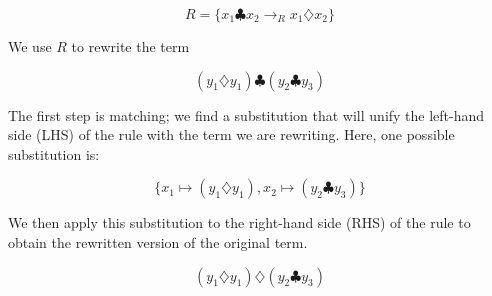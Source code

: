 \documentclass[acmsmall,review,anonymous]{acmart}\settopmatter{printfolios=true,printccs=false,printacmref=false}
\begin{document}
\[ R = \{ x_1 \clubsuit x_2 \rightarrow_R x_1 \diamondsuit x_2 \} \]

We use $R$ to rewrite the term

\[ 
(y_1 \diamondsuit y_1) \clubsuit (y_2 \clubsuit y_3)
\]

The first step is matching; we find a substitution that will unify the left-hand side (LHS) of the rule with the term we are rewriting. Here, one possible substitution is:

\[
\{ x_1 \mapsto (y_1 \diamondsuit y_1), x_2 \mapsto (y_2 \clubsuit y_3) \}
\]

We then apply this substitution to the right-hand side (RHS) of the rule to obtain the rewritten version of the original term.

\[ 
(y_1 \diamondsuit y_1) \diamondsuit (y_2 \clubsuit y_3)
\]
\end{document}
